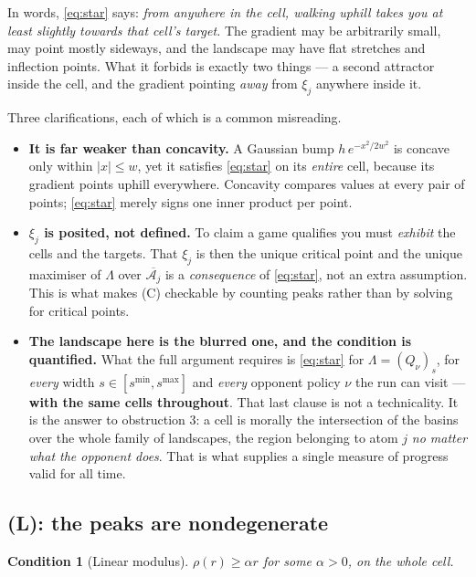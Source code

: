 \documentclass[11pt]{article}
\newtheorem{condition}{Condition}
\theoremstyle{definition}
\newcommand{\cA}{\mathcal{A}}
\begin{document}
\noindent
In words, \eqref{eq:star} says: \emph{from anywhere in the cell, walking uphill
takes you at least slightly towards that cell's target.} The gradient may be
arbitrarily small, may point mostly sideways, and the landscape may have flat
stretches and inflection points. What it forbids is exactly two things --- a
second attractor inside the cell, and the gradient pointing \emph{away} from
$\xi_j$ anywhere inside it.

Three clarifications, each of which is a common misreading.

\begin{itemize}[leftmargin=1.4em, itemsep=3pt]
\item \textbf{It is far weaker than concavity.} A Gaussian bump
  $h\,e^{-x^2/2w^2}$ is concave only within $|x| \le w$, yet it satisfies
  \eqref{eq:star} on its \emph{entire} cell, because its gradient points uphill
  everywhere. Concavity compares values at every pair of points;
  \eqref{eq:star} merely signs one inner product per point.
\item \textbf{$\xi_j$ is posited, not defined.} To claim a game qualifies you must
  \emph{exhibit} the cells and the targets. That $\xi_j$ is then the unique
  critical point and the unique maximiser of $\Lambda$ over $\overline{\cA_j}$ is
  a \emph{consequence} of \eqref{eq:star}, not an extra assumption. This is what
  makes (C) checkable by counting peaks rather than by solving for critical
  points.
\item \textbf{The landscape here is the blurred one, and the condition is
  quantified.} What the full argument requires is \eqref{eq:star} for
  $\Lambda = (Q_\nu)_s$, for \emph{every} width $s \in [s^{\min}, s^{\max}]$ and
  \emph{every} opponent policy $\nu$ the run can visit --- \textbf{with the same
  cells throughout}. That last clause is not a technicality. It is the answer to
  obstruction 3: a cell is morally the intersection of the basins over the whole
  family of landscapes, the region belonging to atom $j$ \emph{no matter what the
  opponent does}. That is what supplies a single measure of progress valid for
  all time.
\end{itemize}

\subsection*{(L): the peaks are nondegenerate}

\begin{condition}[Linear modulus]\label{cond:L}
$\rho(r) \ge \alpha r$ for some $\alpha > 0$, on the whole cell.
\end{condition}
\end{document}
